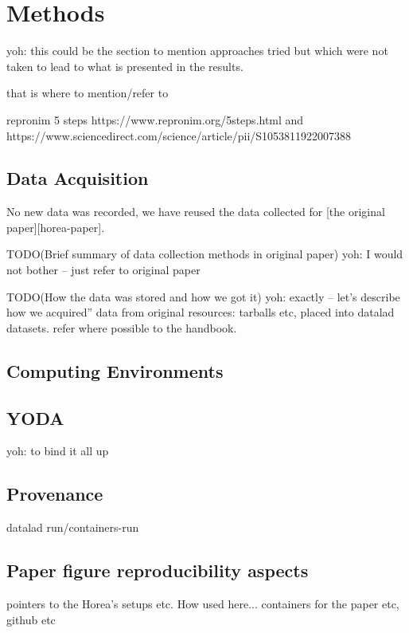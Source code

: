 \section{Methods}

yoh: this could be the section to mention approaches tried but which
were not taken to lead to what is presented in the results.

that is where to mention/refer to

repronim 5 steps  https://www.repronim.org/5steps.html and
https://www.sciencedirect.com/science/article/pii/S1053811922007388

\subsection{Data Acquisition}

No new data was recorded, we have reused the data collected for [the
original paper][horea-paper].

TODO(Brief summary of data collection methods in original paper)
yoh: I would not bother -- just refer to original paper

TODO(How the data was stored and how we got it)
yoh: exactly -- let's describe how we acquired'' data from original
resources: tarballs etc, placed into datalad datasets.  refer where
possible to the handbook.

\subsection{Computing Environments}

\subsection{YODA}

yoh: to bind it all up

\subsection{Provenance}

datalad run/containers-run

\subsection{Paper figure reproducibility aspects}

pointers to the Horea's setups etc. How used here... containers for
the paper etc, github etc

